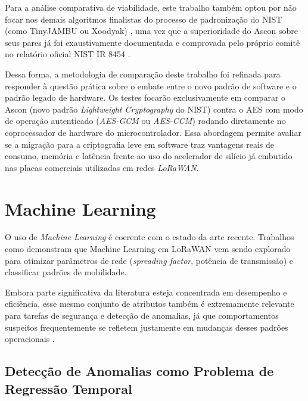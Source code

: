Para a análise comparativa de viabilidade, este trabalho também optou por não focar nos demais algoritmos finalistas do processo de padronização do NIST (como TinyJAMBU ou Xoodyak) , uma vez que a superioridade do Ascon sobre seus pares já foi exaustivamente documentada e comprovada pelo próprio comitê no relatório oficial NIST IR 8454 \cite{nistir8454}.

Dessa forma, a metodologia de comparação deste trabalho foi refinada para responder à questão prática sobre o embate entre o novo padrão de software e o padrão legado de hardware. Os testes focarão exclusivamente em comparar o Ascon (novo padrão \textit{Lightweight Cryptography} do NIST) contra o AES com modo de operação autenticado (\textit{AES-GCM} ou \textit{AES-CCM}) rodando diretamente no coprocessador de hardware do microcontrolador. Essa abordagem permite avaliar se a migração para a criptografia leve em software traz vantagens reais de consumo, memória e latência frente ao uso do acelerador de silício já embutido nas placas comerciais utilizadas em redes \textit{LoRaWAN}.


\section{Machine Learning}

O uso de \textit{Machine Learning} é coerente com o estado da arte recente. 
Trabalhos como \cite{farhad2023} demonstram que Machine Learning em 
LoRaWAN vem sendo explorado para otimizar parâmetros de rede 
(\textit{spreading factor}, potência de transmissão) e classificar padrões 
de mobilidade.

 Embora parte significativa da literatura esteja concentrada em 
desempenho e eficiência, esse mesmo conjunto de atributos também é 
extremamente relevante para tarefas de segurança e detecção de anomalias, 
já que comportamentos suspeitos frequentemente se refletem justamente em 
mudanças desses padrões operacionais \cite{farhad2023, vangelista2023}.


\subsection{Detecção de Anomalias como Problema de Regressão Temporal}

